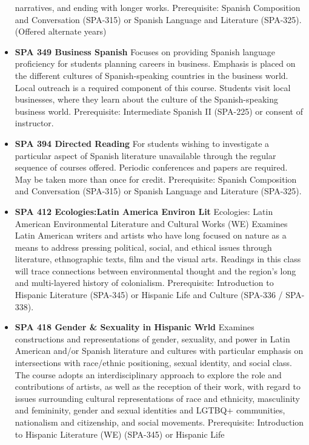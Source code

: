 \documentclass[
  letterpaper,
]{scrbook}
\begin{document}
\begin{itemize}
  narratives, and ending with longer works. Prerequisite: Spanish
  Composition and Conversation (SPA-315) or Spanish Language and
  Literature (SPA-325). (Offered alternate years)\\
\item
  \textbf{SPA 349 Business Spanish} Focuses on providing Spanish
  language proficiency for students planning careers in business.
  Emphasis is placed on the different cultures of Spanish-speaking
  countries in the business world. Local outreach is a required
  component of this course. Students visit local businesses, where they
  learn about the culture of the Spanish-speaking business world.
  Prerequisite: Intermediate Spanish II (SPA-225) or consent of
  instructor.
\item
  \textbf{SPA 394 Directed Reading} For students wishing to investigate
  a particular aspect of Spanish literature unavailable through the
  regular sequence of courses offered. Periodic conferences and papers
  are required. May be taken more than once for credit. Prerequisite:
  Spanish Composition and Conversation (SPA-315) or Spanish Language and
  Literature (SPA-325).\\
\item
  \textbf{SPA 412 Ecologies:Latin America Environ Lit} Ecologies: Latin
  American Environmental Literature and Cultural Works (WE) Examines
  Latin American writers and artists who have long focused on nature as
  a means to address pressing political, social, and ethical issues
  through literature, ethnographic texts, film and the visual arts.
  Readings in this class will trace connections between environmental
  thought and the region's long and multi-layered history of
  colonialism. Prerequisite: Introduction to Hispanic Literature
  (SPA-345) or Hispanic Life and Culture (SPA-336 / SPA-338).
\item
  \textbf{SPA 418 Gender \& Sexuality in Hispanic Wrld} Examines
  constructions and representations of gender, sexuality, and power in
  Latin American and/or Spanish literature and cultures with particular
  emphasis on intersections with race/ethnic positioning, sexual
  identity, and social class. The course adopts an interdisciplinary
  approach to explore the role and contributions of artists, as well as
  the reception of their work, with regard to issues surrounding
  cultural representations of race and ethnicity, masculinity and
  femininity, gender and sexual identities and LGTBQ+ communities,
  nationalism and citizenship, and social movements. Prerequisite:
  Introduction to Hispanic Literature (WE) (SPA-345) or Hispanic Life

\end{itemize}
\end{document}
